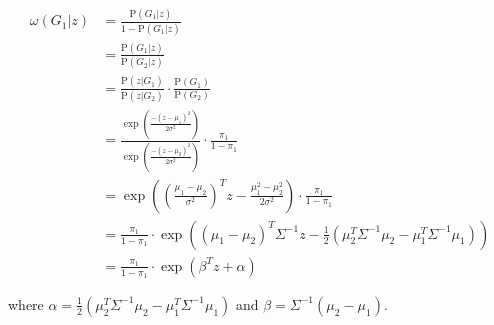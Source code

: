 \documentclass[11pt]{exam} %
\newcommand{\pr}{\text{P}}
\begin{document}
\begin{questions}
\begin{align*}
\omega(G_1|z) &= \frac{\pr(G_1|z)}{1 - \pr(G_1|z)} \\
&= \frac{\pr(G_1|z)}{\pr(G_2|z)} \\
&= \frac{\pr(z|G_1)}{\pr(z|G_2)} \cdot \frac{\pr(G_1)}{\pr(G_2)}\\
&= \frac{    \exp \left( \frac{-(z-\mu_1)^2}{2 \sigma^2}   \right)   }{\exp \left( \frac{-(z-\mu_2)^2}{2 \sigma^2}   \right)} \cdot \frac{\pi_1}{1 - \pi_1}\\
&= \exp \left(     \left( \frac{\mu_1 - \mu_2}{\sigma^2} \right)^T z   - \frac{\mu_1^2 - \mu_2^2}{2 \sigma^2}          \right)   \cdot \frac{\pi_1}{1 - \pi_1}\\
&= \frac{\pi_1}{1 - \pi_1} \cdot \exp \left(  (\mu_1 - \mu_2)^T  \Sigma^{-1} z   - \frac{1}{2} \left(  \mu_2^T \Sigma^{-1} \mu_2   - \mu_1^T \Sigma^{-1} \mu_1    \right)             \right) \\
&= \frac{\pi_1}{1 - \pi_1} \cdot \exp \left(  \beta^T z   + \alpha \right)
\end{align*}

where $\alpha=\frac{1}{2} \left(  \mu_2^T \Sigma^{-1} \mu_2   - \mu_1^T \Sigma^{-1} \mu_1    \right) $ and $\beta = \Sigma^{-1} (\mu_2 - \mu_1)$.





\end{questions}

\end{document}

